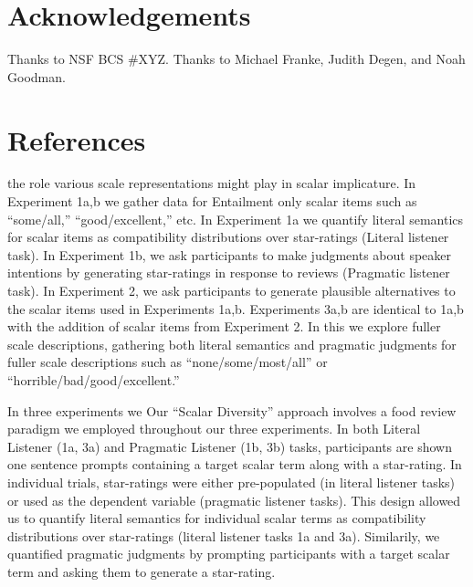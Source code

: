 \documentclass[10pt, letterpaper]{article}
\begin{document}
\section{Acknowledgements}\label{acknowledgements}

Thanks to NSF BCS \#XYZ. Thanks to Michael Franke, Judith Degen, and
Noah Goodman.

\section{References}\label{references}

\setlength{\parindent}{-0.1in} \setlength{\leftskip}{0.125in} \noindent

the role various scale representations might play in scalar implicature.
In Experiment 1a,b we gather data for Entailment only scalar items such
as ``some/all,'' ``good/excellent,'' etc. In Experiment 1a we quantify
literal semantics for scalar items as compatibility distributions over
star-ratings (Literal listener task). In Experiment 1b, we ask
participants to make judgments about speaker intentions by generating
star-ratings in response to reviews (Pragmatic listener task). In
Experiment 2, we ask participants to generate plausible alternatives to
the scalar items used in Experiments 1a,b. Experiments 3a,b are
identical to 1a,b with the addition of scalar items from Experiment 2.
In this we explore fuller scale descriptions, gathering both literal
semantics and pragmatic judgments for fuller scale descriptions such as
``none/some/most/all'' or ``horrible/bad/good/excellent.''

In three experiments we Our ``Scalar Diversity'' approach involves a
food review paradigm we employed throughout our three experiments. In
both Literal Listener (1a, 3a) and Pragmatic Listener (1b, 3b) tasks,
participants are shown one sentence prompts containing a target scalar
term along with a star-rating. In individual trials, star-ratings were
either pre-populated (in literal listener tasks) or used as the
dependent variable (pragmatic listener tasks). This design allowed us to
quantify literal semantics for individual scalar terms as compatibility
distributions over star-ratings (literal listener tasks 1a and 3a).
Similarily, we quantified pragmatic judgments by prompting participants
with a target scalar term and asking them to generate a star-rating.
\end{document}
